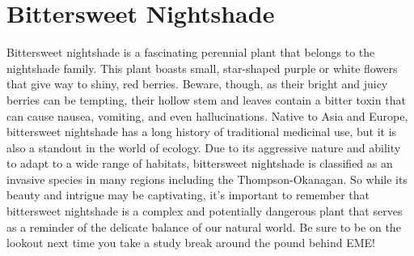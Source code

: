 \documentclass[
]{book}
\begin{document}
\hypertarget{bittersweet-nightshade}{%
\section{Bittersweet Nightshade}\label{bittersweet-nightshade}}

Bittersweet nightshade is a fascinating perennial plant that belongs to the nightshade family. This plant boasts small, star-shaped purple or white flowers that give way to shiny, red berries. Beware, though, as their bright and juicy berries can be tempting, their hollow stem and leaves contain a bitter toxin that can cause nausea, vomiting, and even hallucinations. Native to Asia and Europe, bittersweet nightshade has a long history of traditional medicinal use, but it is also a standout in the world of ecology. Due to its aggressive nature and ability to adapt to a wide range of habitats, bittersweet nightshade is classified as an invasive species in many regions including the Thompson-Okanagan. So while its beauty and intrigue may be captivating, it's important to remember that bittersweet nightshade is a complex and potentially dangerous plant that serves as a reminder of the delicate balance of our natural world. Be sure to be on the lookout next time you take a study break around the pound behind EME!
\end{document}
